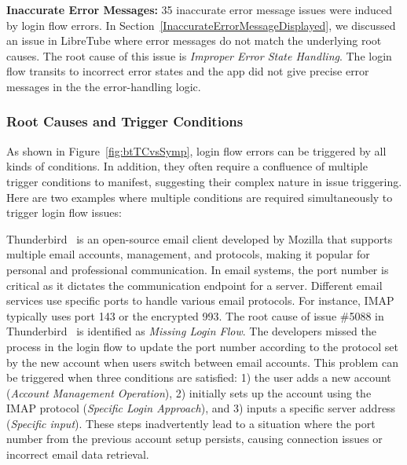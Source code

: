 \textbf{Inaccurate Error Messages:} 35 inaccurate error message issues were induced by login flow errors.
In Section~\ref{InaccurateErrorMessageDisplayed}, we discussed an issue in LibreTube where error messages do not match the underlying root causes.
The root cause of this issue is \textit{Improper Error State Handling}. 
The login flow transits to incorrect error states and the app did not give precise error messages in the the error-handling logic.
  
\subsubsection{Root Causes and Trigger Conditions}
As shown in Figure~\ref{fig:btTCvsSymp}, login flow errors can be triggered by all kinds of conditions.
In addition, they often require a confluence of multiple trigger conditions to manifest, suggesting their complex nature in issue triggering. Here are two examples where multiple conditions are required simultaneously  to trigger login flow issues:

Thunderbird~\cite{thunderbird-android} is an open-source email client developed by Mozilla that supports multiple email accounts, management, and protocols, making it popular for personal and professional communication.
In email systems, the port number is critical as it dictates the communication endpoint for a server. Different email services use specific ports to handle various email protocols.
For instance, IMAP typically uses port 143 or the encrypted 993.
The root cause of issue \#5088 
in Thunderbird~\cite{ThunderbirdIssue} is identified as \textit{Missing Login Flow}. The developers missed the process in the login flow to update the port number according to the protocol set by the new account when users switch between email accounts. 
This problem can be triggered when three conditions are satisfied: 1) the user adds a new account (\textit{Account Management Operation}), 2) initially sets up the account using the IMAP protocol (\textit{Specific Login Approach}), and 3) inputs a specific server address (\textit{Specific input}). These steps inadvertently lead to a situation where the port number from the previous account setup persists, causing connection issues or incorrect email data retrieval. 

